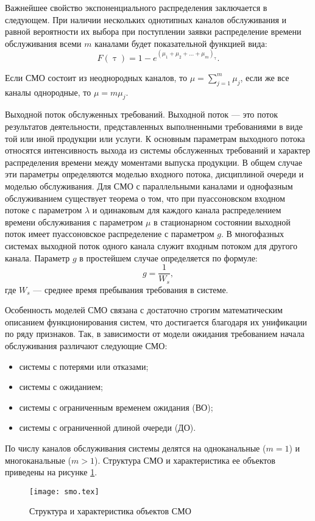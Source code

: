 Важнейшее свойство экспоненциального распределения заключается в следующем. При наличии нескольких однотипных каналов обслуживания и равной вероятности их выбора при поступлении заявки распределение времени обслуживания всеми $m$ каналами будет показательной функцией вида:
\[F(\uptau) = 1-e^{(\mu_1 +\mu_2 + ... + \mu_m)_{\uptau}}.\]

Если СМО состоит из неоднородных каналов, то $\mu = \sum\limits_{j=1}^m\mu_j$, если же все каналы однородные, то $\mu = m \mu_j$.

Выходной поток обслуженных требований. Выходной поток — это поток результатов деятельности, представленных выполненными требованиями в виде той или иной продукции или услуги. К основным параметрам выходного потока относятся интенсивность выхода из системы обслуженных требований и характер распределения времени между моментами выпуска продукции. В общем случае эти параметры определяются моделью входного потока, дисциплиной очереди и моделью обслуживания. Для СМО с параллельными каналами и однофазным обслуживанием существует теорема о том, что при пуассоновском входном потоке с параметром $\lambda$ и одинаковым для каждого канала распределением времени обслуживания с параметром $\mu$ в стационарном состоянии выходной поток имеет пуассоновское распределение с параметром $g$. В многофазных системах выходной поток одного канала служит входным потоком для другого канала. Параметр $g$ в простейшем случае определяется по формуле:
\[g=\dfrac{1}{W_s},\]
где $W_s$ --- среднее время пребывания требования в системе.

Особенность моделей СМО связана с достаточно строгим математическим описанием функционирования систем, что достигается благодаря их унификации по ряду признаков. Так, в зависимости от модели ожидания требованием начала обслуживания различают следующие СМО:
\begin{itemize}
	\item системы с потерями или отказами;
	\item системы с ожиданием;
	\item системы с ограниченным временем ожидания (ВО);
\item системы с ограниченной длиной очереди (ДО).
\end{itemize}

По числу каналов обслуживания системы делятся на одноканальные ($m = 1$) и многоканальные ($m > 1$). Структура СМО и характеристика ее объектов приведены на рисунке \ref{fig:}.

\begin{figure}
	\centering
	\texttt{[image: smo.tex]}
	\caption{Структура и характеристика объектов СМО}
	\label{fig:}
\end{figure}


